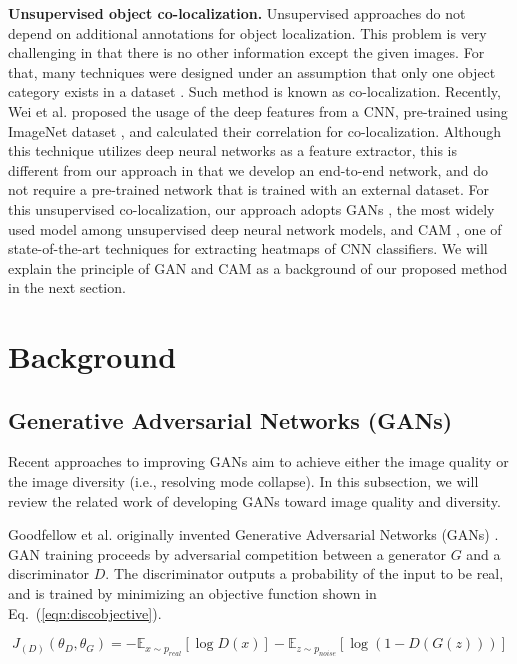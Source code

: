 \documentclass[runningheads]{llncs}
\begin{document}
\noindent\textbf{Unsupervised object co-localization.} Unsupervised approaches do not depend on additional annotations for object localization. This problem is very challenging in that there is no other information except the given images. For that, many techniques were designed under an assumption that only one object category exists in a dataset \cite{kim2009unsupervised,rubinstein2013unsupervised,tang2014co,zhu2015unsupervised,cho2015unsupervised,wei2017deep}. Such method is known as co-localization. Recently, Wei et al. \cite{wei2017deep} proposed the usage of the deep features from a CNN, pre-trained using ImageNet dataset \cite{russakovsky2015imagenet}, and calculated their correlation for co-localization. Although this technique utilizes deep neural networks as a feature extractor, this is different from our approach in that we develop an end-to-end network, and do not require a pre-trained network that is trained with an external dataset. For this unsupervised co-localization, our approach adopts GANs \cite{goodfellow2014generative}, the most widely used model among unsupervised deep neural network models, and CAM \cite{zhou2016learning}, one of state-of-the-art techniques for extracting heatmaps of CNN classifiers. We will explain the principle of GAN and CAM as a background of our proposed method in the next section.


\section{Background}
\label{sec:background}


\subsection{Generative Adversarial Networks (GANs)}

Recent approaches to improving GANs aim to achieve either the image quality or the image diversity (i.e., resolving mode collapse). In this subsection, we will review the related work of developing GANs toward image quality and diversity.

Goodfellow et al. originally invented Generative Adversarial Networks (GANs) \cite{goodfellow2014generative}. GAN training proceeds by adversarial competition between a generator $G$ and a discriminator $D$. The discriminator outputs a probability of the input to be real, and is trained by minimizing an objective function shown in Eq.~(\ref{eqn:discobjective}). 

\vspace*{-5mm}
\begin{equation}
    J_{(D)}(\theta_{D},\theta_{G})=
    -\mathbb{E}_{x\sim p_{real}}[\log{D(x)}]
    -\mathbb{E}_{z\sim p_{noise}}[\log{(1-D(G(z)))}]\label{eqn:discobjective}
\end{equation}
\end{document}

